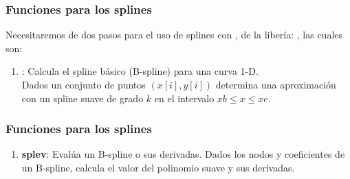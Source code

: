 \documentclass[12pt]{beamer}
\begin{document}
\begin{frame}
\frametitle{Funciones para los splines}
Necesitaremos de dos pasos para el uso de splines con \python, de la libería: , las cuales son:
\pause
{}
\begin{enumerate}[<+->]
\item {}: Calcula el spline básico (B-spline) para una curva 1-D.
\\
\medskip
Dados un conjunto de puntos $(x[i],y[i])$ determina una aproximación con un spline suave de grado $k$ en el intervalo $xb \leq x \leq xe$.
\seti
\end{enumerate}
\end{frame}
\begin{frame}
\frametitle{Funciones para los splines}
\begin{enumerate}[<+->]
\conti    
\item \textbf{splev}: Evalúa un B-spline o sus derivadas. Dados los nodos y coeficientes de un B-spline, calcula 
el valor del polinomio suave y sus derivadas.
\end{enumerate}
\end{frame}




\end{document}
